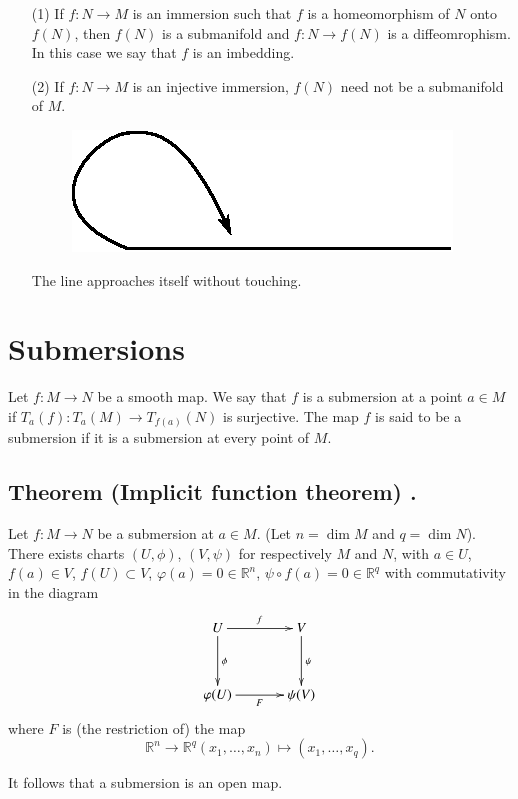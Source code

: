 \begin{remarks*}
\begin{itemize}
\item[(1)] If $f:N\to M$ is an immersion such that $f$ is a homeomorphism of $N$ onto $f(N)$, then $f(N)$ is a submanifold and $f:N\to f(N)$ is a diffeomrophism. In this case we say that $f$ is an imbedding.

\item[(2)] If $f:N\to M$ is an injective immersion, $f(N)$ need not be a submanifold of $M$.
\begin{figure}[H]
\centering
\includegraphics{1.eps}
\end{figure}\pageoriginale
The line approaches itself without touching.
\end{itemize}
\end{remarks*}

\section*{Submersions}

Let $f:M\to N$ be a smooth map. We say that $f$ is a submersion at a point $a\in M$ if $T_{a}(f):T_{a}(M)\to T_{f(a)}(N)$ is surjective. The map $f$ is said to be a submersion if it is a submersion at every point of $M$.

\subsection*{Theorem (Implicit function theorem) .\label{chap7-thm7.2}}

Let $f:M\to N$ be a submersion at $a\in M$. (Let $n=\dim M$ and $q=\dim N$). There exists charts $(U,\phi)$, $(V,\psi)$ for respectively $M$ and $N$, with $a\in U$, $f(a)\in V$, $f(U)\subset V$, $\varphi(a)=0\in \mathbb{R}^{n}$, $\psi\circ f(a)=0\in \mathbb{R}^{q}$ with commutativity in the diagram
\[
\xymatrix@=1.2cm{
U\ar[d]^{\phi}\ar[r]^{f} & V\ar[d]^{\psi}\\
\varphi(U)\ar[r]_{F} & \psi(V)
}
\]
where $F$ is (the restriction of) the map 
$$
\mathbb{R}^{n}\to \mathbb{R}^{q}(x_{1},\ldots,x_{n})\mapsto (x_{1},\ldots,x_{q}).
$$

It follows that a submersion is an open map.



